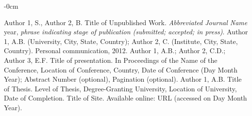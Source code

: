 \documentclass[energies,article,submit,pdftex,moreauthors]{Definitions/mdpi}
\begin{document}
\begin{adjustwidth}{-\extralength}{0cm}
\begin{thebibliography}{999}
Author 1, S., Author 2, B. Title of Unpublished Work. \textit{Abbreviated Journal Name} year, \textit{phrase indicating stage of publication (submitted; accepted; in press)}.
Author 1, A.B. (University, City, State, Country); Author 2, C. (Institute, City, State, Country). Personal communication, 2012.
Author 1, A.B.; Author 2, C.D.; Author 3, E.F. Title of presentation. In Proceedings of the Name of the Conference, Location of Conference, Country, Date of Conference (Day Month Year); Abstract Number (optional), Pagination (optional).
Author 1, A.B. Title of Thesis. Level of Thesis, Degree-Granting University, Location of University, Date of Completion.
Title of Site. Available online: URL (accessed on Day Month Year).
\end{thebibliography}

%


\end{adjustwidth}
\end{document}
